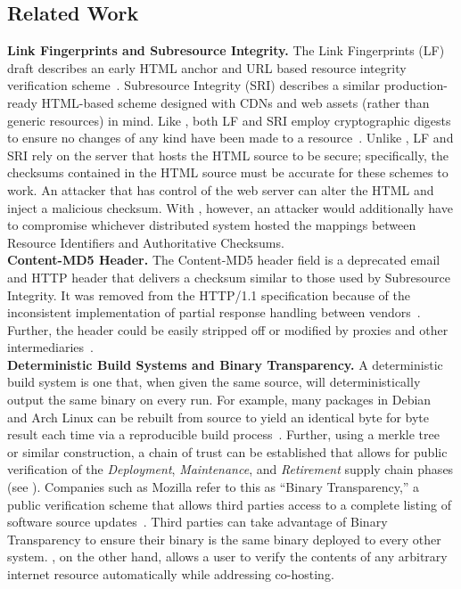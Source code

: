 \subsection{Related Work}

\noindent\textbf{Link Fingerprints and Subresource Integrity.} The Link
Fingerprints (LF) draft describes an early HTML anchor and URL based resource
integrity verification scheme~\cite{LF}. Subresource Integrity (SRI) describes a
similar production-ready HTML-based scheme designed with CDNs and web assets
(rather than generic resources) in mind. Like \SYSTEM{}, both LF and SRI employ
cryptographic digests to ensure no changes of any kind have been made to a
resource~\cite{SRI}. Unlike \SYSTEM{}, LF and SRI rely on the server that hosts
the HTML source to be secure; specifically, the checksums contained in the HTML
source must be accurate for these schemes to work. An attacker that has control
of the web server can alter the HTML and inject a malicious checksum. With
\SYSTEM{}, however, an attacker would additionally have to compromise whichever
distributed system hosted the mappings between Resource Identifiers and
Authoritative Checksums. \\

\noindent\textbf{Content-MD5 Header.} The Content-MD5 header field is a
deprecated email and HTTP header that delivers a checksum similar to those used
by Subresource Integrity. It was removed from the HTTP/1.1 specification because
of the inconsistent implementation of partial response handling between
vendors~\cite{HTTP1.1}. Further, the header could be easily stripped off or
modified by proxies and other intermediaries~\cite{MD5Header}. \\

\noindent\textbf{Deterministic Build Systems and Binary Transparency.} A
deterministic build system is one that, when given the same source, will
deterministically output the same binary on every run. For example, many
packages in Debian~\cite{ReproBuildsDebian} and Arch Linux can be rebuilt from
source to yield an identical byte for byte result each time via a reproducible
build process~\cite{ReproBuilds}. Further, using a merkle tree~\cite{MerkleTree}
or similar construction, a chain of trust can be established that allows for
public verification of the \emph{Deployment}, \emph{Maintenance}, and
\emph{Retirement} supply chain phases (see ). Companies such as
Mozilla refer to this as ``Binary Transparency,'' a public verification scheme
that allows third parties access to a complete listing of software source
updates~\cite{BinaryTransparency}. Third parties can take advantage of Binary
Transparency to ensure their binary is the same binary deployed to every other
system. \SYSTEM{}, on the other hand, allows a user to verify the contents of
any arbitrary internet resource automatically while addressing co-hosting. \\


